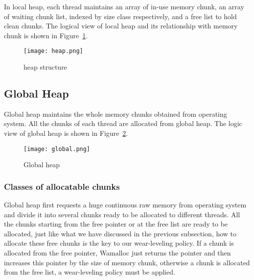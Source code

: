 \documentclass[10pt, conference, compsocconf]{IEEEtran}
\begin{document}

In local heap,
each thread maintains an array of in-use memory chunk, 
an array of waiting chunk list, indexed by size class respectively, 
and a free list to hold clean chunks.
The logical view of local heap and its relationship with memory chunk is shown in Figure~\ref{fig:heap}.

\begin{figure}[h]
\centering
\texttt{[image: heap.png]}
\caption{heap structure}
\label{fig:heap}
\end{figure}

\subsection{Global Heap}

Global heap maintains the whole memory chunks obtained from operating system. 
All the chunks of each thread are allocated from global heap. 
The logic view of global heap is shown in Figure~\ref{fig:global}.

\begin{figure}[h]
\centering
\texttt{[image: global.png]}
\caption{Global heap }
\label{fig:global}
\end{figure}

\subsubsection{Classes of allocatable chunks}
Global heap first requests a huge continuous raw memory from operating system
and divide it into several chunks ready to be allocated to different threads.
All the chunks starting from the free pointer or at the free list are ready to be allocated, 
just like what we have discussed in the previous subsection,
how to allocate these free chunks is the key to our wear-leveling policy.
If a chunk is allocated from the free pointer, Wamalloc just returns the pointer and then increases this pointer by the size of memory chunk, 
otherwise a chunk is allocated from the free list, a wear-leveling policy must be applied.
\end{document}
